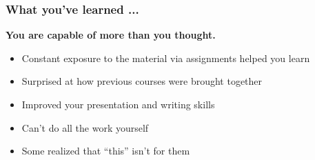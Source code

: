 \begin{frame}\frametitle{What you've learned ...}
	\begin{exampleblock}{}
		\begin{center}
			\textbf{\large You are capable of more than you thought.}
		\end{center}
	\end{exampleblock}
	\begin{itemize}
		\item	Constant exposure to the material via assignments helped you learn
		\item	Surprised at how previous courses were brought together
		\item	Improved your presentation and writing skills
		\item	Can't do all the work yourself
		\item	Some realized that ``this'' isn't for them
	\end{itemize}
\end{frame}

% 
% 

